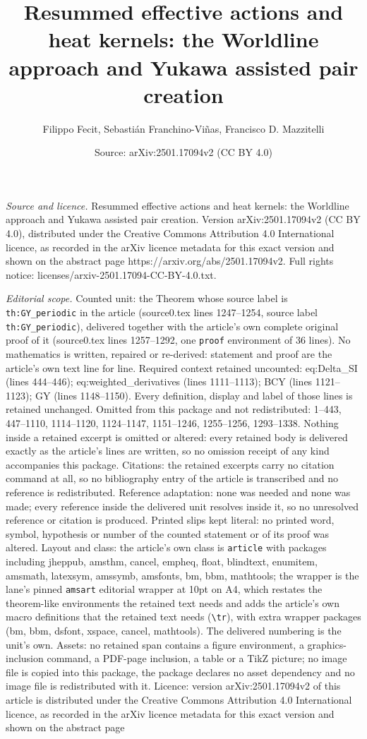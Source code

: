\documentclass[10pt,a4paper]{amsart}
\title[Resummed effective actions and heat kernels: the Worldline a]{Resummed effective actions and heat kernels: the Worldline approach and Yukawa assisted pair creation}
\author{Filippo Fecit, Sebasti\'an Franchino-Vi\~nas, Francisco D. Mazzitelli}
\date{Source: arXiv:2501.17094v2 (CC BY 4.0)}
\begin{document}
\maketitle

\noindent\emph{Source and licence.} Resummed effective actions and heat kernels: the Worldline approach and Yukawa assisted pair creation. Version arXiv:2501.17094v2 (CC BY 4.0), distributed under the Creative Commons Attribution 4.0 International licence, as recorded in the arXiv licence metadata for this exact version and shown on the abstract page https://arxiv.org/abs/2501.17094v2. Full rights notice: licenses/arxiv-2501.17094-CC-BY-4.0.txt.\par\smallskip

\noindent\textit{Editorial scope.} Counted unit: the Theorem whose source label is \texttt{th:GY\_periodic} in the article (source0.tex lines 1247--1254, source label \texttt{th:GY\_periodic}), delivered together with the article's own complete original proof of it (source0.tex lines 1257--1292, one \texttt{proof} environment of 36 lines). No mathematics is written, repaired or re-derived: statement and proof are the article's own text line for line. Required context retained uncounted: eq:Delta\_SI (lines 444--446); eq:weighted\_derivatives (lines 1111--1113); BCY (lines 1121--1123); GY (lines 1148--1150). Every definition, display and label of those lines is retained unchanged. Omitted from this package and not redistributed: 1--443, 447--1110, 1114--1120, 1124--1147, 1151--1246, 1255--1256, 1293--1338. Nothing inside a retained excerpt is omitted or altered: every retained body is delivered exactly as the article's lines are written, so no omission receipt of any kind accompanies this package. Citations: the retained excerpts carry no citation command at all, so no bibliography entry of the article is transcribed and no reference is redistributed. Reference adaptation: none was needed and none was made; every reference inside the delivered unit resolves inside it, so no unresolved reference or citation is produced. Printed slips kept literal: no printed word, symbol, hypothesis or number of the counted statement or of its proof was altered. Layout and class: the article's own class is \texttt{article} with packages including jheppub, amsthm, cancel, empheq, float, blindtext, enumitem, amsmath, latexsym, amssymb, amsfonts, bm, bbm, mathtools; the wrapper is the lane's pinned \texttt{amsart} editorial wrapper at 10pt on A4, which restates the theorem-like environments the retained text needs and adds the article's own macro definitions that the retained text needs (\texttt{\textbackslash tr}), with extra wrapper packages (bm, bbm, dsfont, xspace, cancel, mathtools). The delivered numbering is the unit's own. Assets: no retained span contains a figure environment, a graphics-inclusion command, a PDF-page inclusion, a table or a TikZ picture; no image file is copied into this package, the package declares no asset dependency and no image file is redistributed with it. Licence: version arXiv:2501.17094v2 of this article is distributed under the Creative Commons Attribution 4.0 International licence, as recorded in the arXiv licence metadata for this exact version and shown on the abstract page 
\end{document}
